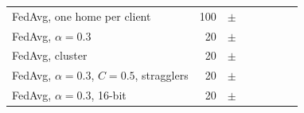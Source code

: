 \begin{table}
\begin{tabular}{lrrrrrrr}
FedAvg, one home per client & 100 & \EonethreefedavghouseholdMAE{} $\pm$ \EonethreefedavghouseholdMAEsd{} & \EonethreefedavghouseholdRMSE{} & \EonethreefedavghouseholdWAPE{} & \EonethreefedavghouseholdGap{} & \EonethreefedavghouseholdFT{} & \EonethreefedavghouseholdMB{} \\
FedAvg, $\alpha=0.3$ & 20 & \EfourfedavgmoderateMAE{} $\pm$ \EfourfedavgmoderateMAEsd{} & \EfourfedavgmoderateRMSE{} & \EfourfedavgmoderateWAPE{} & \EfourfedavgmoderateGap{} & \EfourfedavgmoderateFT{} & \EfourfedavgmoderateMB{} \\
FedAvg, cluster & 20 & \EsixfedavgstrongMAE{} $\pm$ \EsixfedavgstrongMAEsd{} & \EsixfedavgstrongRMSE{} & \EsixfedavgstrongWAPE{} & \EsixfedavgstrongGap{} & \EsixfedavgstrongFT{} & \EsixfedavgstrongMB{} \\
FedAvg, $\alpha=0.3$, $C=0.5$, stragglers & 20 & \EeightfedavgpartialMAE{} $\pm$ \EeightfedavgpartialMAEsd{} & \EeightfedavgpartialRMSE{} & \EeightfedavgpartialWAPE{} & \EeightfedavgpartialGap{} & \EeightfedavgpartialFT{} & \EeightfedavgpartialMB{} \\
FedAvg, $\alpha=0.3$, 16-bit & 20 & \EonetwofedavgfponesixmoderateMAE{} $\pm$ \EonetwofedavgfponesixmoderateMAEsd{} & \EonetwofedavgfponesixmoderateRMSE{} & \EonetwofedavgfponesixmoderateWAPE{} & \EonetwofedavgfponesixmoderateGap{} & \EonetwofedavgfponesixmoderateFT{} & \EonetwofedavgfponesixmoderateMB{} \\
\end{tabular}
\end{table}

